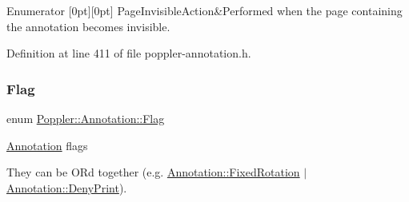 \begin{DoxyEnumFields}{Enumerator}
[0pt][0pt]{}\mbox{\label{class_poppler_1_1_annotation_adab1fa85588b8f9fcdf20cdf37c1be97a9f96283019b53b0dac7e6fd40eb51aec}} 
Page\+Invisible\+Action&Performed when the page containing the annotation becomes invisible. \\
\hline

\end{DoxyEnumFields}


Definition at line 411 of file poppler-\/annotation.\+h.

\mbox{\label{class_poppler_1_1_annotation_a8c2dca956649e4ce454361d5b75dc270}} 
\subsubsection{\texorpdfstring{Flag}{Flag}}
{\footnotesize\ttfamily enum \hyperlink{class_poppler_1_1_annotation_a8c2dca956649e4ce454361d5b75dc270}{Poppler\+::\+Annotation\+::\+Flag}}

\hyperlink{class_poppler_1_1_annotation}{Annotation} flags

They can be OR\textquotesingle{}d together (e.\+g. \hyperlink{class_poppler_1_1_annotation_a8c2dca956649e4ce454361d5b75dc270a61bee11edae896858409dd65d14d3a70}{Annotation\+::\+Fixed\+Rotation} $\vert$ \hyperlink{class_poppler_1_1_annotation_a8c2dca956649e4ce454361d5b75dc270abc4b217d0e1932558a182595a1ffadaf}{Annotation\+::\+Deny\+Print}).

